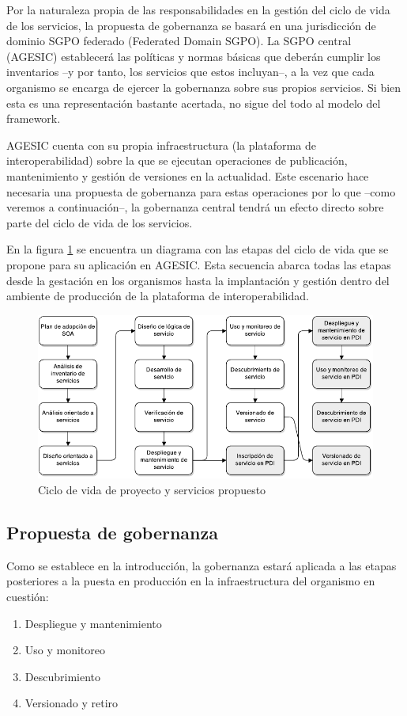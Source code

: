 \documentclass[11pt]{article}
\begin{document}
			Por la naturaleza propia de las responsabilidades en la gestión del ciclo de vida de los servicios, la propuesta de gobernanza se basará en una jurisdicción de dominio SGPO federado (Federated Domain SGPO). La SGPO central (AGESIC) establecerá las políticas y normas básicas que deberán cumplir los inventarios –y por tanto, los servicios que estos incluyan–, a la vez que cada organismo se encarga de ejercer la gobernanza sobre sus propios servicios. Si bien esta es una representación bastante acertada, no sigue del todo al modelo del framework.

			AGESIC cuenta con su propia infraestructura (la plataforma de interoperabilidad) sobre la que se ejecutan operaciones de publicación, mantenimiento y gestión de versiones en la actualidad. Este escenario hace necesaria una propuesta de gobernanza para estas operaciones por lo que –como veremos a continuación–, la gobernanza central tendrá un efecto directo sobre parte del ciclo de vida de los servicios.

			En la figura \ref{figura:ciclo_de_vida_propuesta} se encuentra un diagrama con las etapas del ciclo de vida que se propone para su aplicación en AGESIC. Esta secuencia abarca todas las etapas desde la gestación en los organismos hasta la implantación y gestión dentro del ambiente de producción de la plataforma de interoperabilidad.

			\begin{figure}[h]
			    \centering
			    \includegraphics[width=\linewidth]{ciclo_de_vida_propuesta}
			    \caption{Ciclo de vida de proyecto y servicios propuesto}
			    \label{figura:ciclo_de_vida_propuesta}
			\end{figure}

		\subsection{Propuesta de gobernanza}
			Como se establece en la introducción, la gobernanza estará aplicada a las etapas posteriores a la puesta en producción en la infraestructura del organismo en cuestión:
			\begin{enumerate}
				\item Despliegue y mantenimiento
				\item Uso y monitoreo
				\item Descubrimiento
				\item Versionado y retiro
			\end{enumerate}
\end{document}
